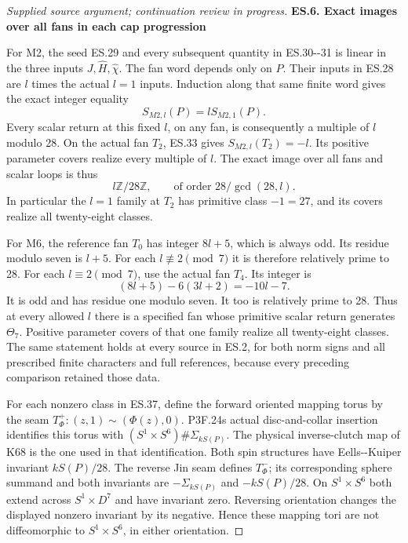 \begin{proof}[Supplied source argument; continuation review in progress]
\par

\medskip\noindent\textbf{ES.6. Exact images over all fans in each cap progression}

\par\nobreak

For M2, the seed ES.29 and every subsequent quantity in
ES.30-\/-31 is linear in the three inputs \(J,\widehat H,
\widehat\chi\). The fan word depends only on \(P\).
Their inputs in ES.28 are \(l\) times the actual
\(l=1\) inputs. Induction along that same finite word
gives the exact integer equality
\[
 S_{M2,l}(P)=lS_{M2,1}(P).
 \tag{ES.38}
\]
Every scalar return at this fixed \(l\), on any fan,
is consequently a multiple of \(l\) modulo 28.
On the actual fan \(T_2\), ES.33 gives
\(S_{M2,l}(T_2)=-l\). Its positive parameter covers
realize every multiple of \(l\). The exact image
over all fans and scalar loops is thus
\[
             l\mathbb Z/28\mathbb Z,
 \qquad \text{of order }28/\gcd(28,l).
 \tag{ES.39}
\]
In particular the \(l=1\) family at \(T_2\) has
primitive class \(-1=27\), and its covers realize
all twenty-eight classes.

For M6, the reference fan \(T_0\) has integer
\(8l+5\), which is always odd. Its residue modulo
seven is \(l+5\). For each \(l\not\equiv2\pmod7\)
it is therefore relatively prime to 28. For each
\(l\equiv2\pmod7\), use the actual fan \(T_4\).
Its integer is
\[
 (8l+5)-6(3l+2)=-10l-7.
 \tag{ES.40}
\]
It is odd and has residue one modulo seven.
It too is relatively prime to 28. Thus at every
allowed \(l\) there is a specified fan whose
primitive scalar return generates \(\Theta_7\).
Positive parameter covers of that one family
realize all twenty-eight classes. The same
statement holds at every source in ES.2, for
both norm signs and all prescribed finite
characters and full references, because every
preceding comparison retained those data.

For each nonzero class in ES.37, define the forward
oriented mapping torus by the seam
\(T^+_\Phi:(z,1)\sim(\Phi(z),0)\).
P3F.24\textquotesingle s actual disc-and-collar insertion identifies this
torus with
\((S^1\times S^6)\#\Sigma_{kS(P)}\).
The physical inverse-clutch map of K68 is the
one used in that identification. Both spin
structures have Eells-\/-Kuiper invariant
\(kS(P)/28\). The reverse Jin seam defines \(T^-_\Phi\);
its corresponding sphere summand and both invariants
are \(-\Sigma_{kS(P)}\) and \(-kS(P)/28\).
On \(S^1\times S^6\) both
extend across \(S^1\times D^7\) and have
invariant zero. Reversing orientation changes
the displayed nonzero invariant by its negative.
Hence these mapping tori are not diffeomorphic
to \(S^1\times S^6\), in either orientation.


\end{proof}
